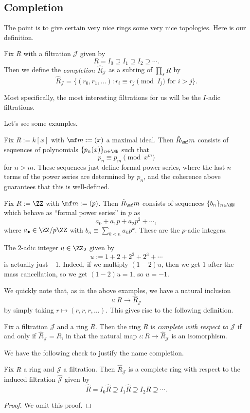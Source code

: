 \subsection{Completion}
The point is to give certain very nice rings some very nice topologies. Here is our definition.
\begin{definition}
	Fix $R$ with a filtration $\mathcal J$ given by
	\[R=I_0\supseteq I_1\supseteq I_2\supseteq\cdots.\]
	Then we define the \textit{completion $\hat R_\mathcal J$} as a subring of $\prod_sR$ by
	\[\hat R_\mathcal J=\{(r_0,r_1,\ldots):r_i\equiv r_j\pmod{I_j}\text{ for }i>j\}.\]
\end{definition}
Most specifically, the most interesting filtrations for us will be the $I$-adic filtrations.

Let's see some examples.
\begin{example}
	Fix $R:=k[x]$ with $\mf m:=(x)$ a maximal ideal. Then $\hat R_\mf m$ consists of sequences of polynomials $\{p_n(x)\}_{n\in\NN}$ such that
	\[p_n\equiv p_m\pmod{x^m}\]
	for $n>m$. These sequences just define formal power series, where the last $n$ terms of the power series are determined by $p_n$, and the coherence above guarantees that this is well-defined.
\end{example}
\begin{example}
	Fix $R:=\ZZ$ with $\mf m:=(p)$. Then $\hat R_\mf m$ consists of sequences $\{b_n\}_{n\in\NN}$ which behave as ``formal power series'' in $p$ as
	\[a_0+a_1p+a_2p^2+\cdots,\]
	where $a_\bullet\in\ZZ/p\ZZ$ with $b_n\equiv\sum_{k<n}a_kp^k$. These are the $p$-adic integers.
\end{example}
\begin{example}
	The $2$-adic integer $u\in\ZZ_2$ given by
	\[u:=1+2+2^2+2^3+\cdots\]
	is actually just $-1$. Indeed, if we multiply $(1-2)u$, then we get $1$ after the mass cancellation, so we get $(1-2)u=1$, so $u=-1$.
\end{example}
We quickly note that, as in the above examples, we have a natural inclusion
\[\iota:R\to\hat R_\mathcal J\]
by simply taking $r\mapsto(r,r,r,\ldots)$. This gives rise to the following definition.
\begin{definition}[Complete]
	Fix a filtration $\mathcal J$ and a ring $R$. Then the ring $R$ is \textit{complete with respect to $\mathcal J$} if and only if $\hat R_\mathcal J=R$, in that the natural map $\iota:R\to\hat R_\mathcal J$ is an isomorphism.
\end{definition}
We have the following check to justify the name completion.
\begin{lemma}
	Fix $R$ a ring and $\mathcal J$ a filtration. Then $\hat R_\mathcal J$ is a complete ring with respect to the induced filtration $\hat{\mathcal J}$ given by
	\[\hat R=I_0\hat R\supseteq I_1\hat R\supseteq I_2\hat R\supseteq\cdots.\]
\end{lemma}
\begin{proof}
	We omit this proof.
\end{proof}

